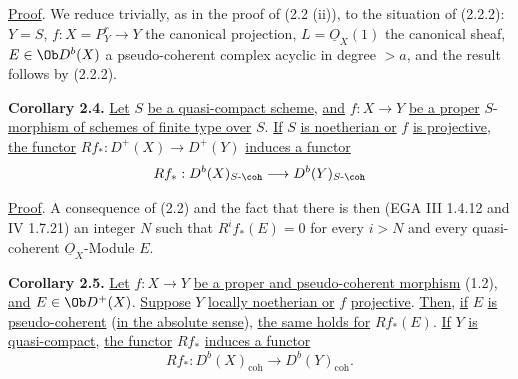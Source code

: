 \uline{Proof}. We reduce trivially, as in the proof of (2.2 (ii)), to the situation of (2.2.2): \(Y=S\), \(f:X=P^r_Y\to Y\) the canonical projection, \(L=\underline{O}_X(1)\) the canonical sheaf, \(E\in\Ob D^b(X)\) a pseudo-coherent complex acyclic in degree \(>a\), and the result follows by (2.2.2).

\textbf{Corollary 2.4.} \uline{Let} \(S\) \uline{be a quasi-compact scheme}, \uline{and} \(f:X\to Y\) \uline{be a proper} \(S\)-\uline{morphism of schemes of finite type over} \(S\). \uline{If} \(S\) \uline{is noetherian or} \(f\) \uline{is projective}, \uline{the functor} \(Rf_*:D^+(X)\longrightarrow D^+(Y)\) \uline{induces a functor}
\[
  Rf_*:D^b(X)_{S\text{-}\coh}\longrightarrow D^b(Y)_{S\text{-}\coh}
\]

\uline{Proof}. A consequence of (2.2) and the fact that there is then (EGA III 1.4.12 and IV 1.7.21) an integer \(N\) such that \(R^if_*(E)=0\) for every \(i>N\) and every quasi-coherent \(\underline{O}_X\)-Module \(E\).

\textbf{Corollary 2.5.} \uline{Let} \(f:X\to Y\) \uline{be a proper and pseudo-coherent morphism} (1.2), \uline{and} \(E\in\Ob D^+(X)\). \uline{Suppose} \(Y\) \uline{locally noetherian or} \(f\) \uline{projective}. \uline{Then}, \uline{if} \(E\) \uline{is pseudo-coherent} (\uline{in the absolute sense}), \uline{the same holds for} \(Rf_*(E)\). \uline{If} \(Y\) \uline{is quasi-compact}, \uline{the functor} \(Rf_*\) \uline{induces a functor}
\[
  Rf_*:D^b(X)_{\mathrm{coh}}\longrightarrow D^b(Y)_{\mathrm{coh}}.
\]

